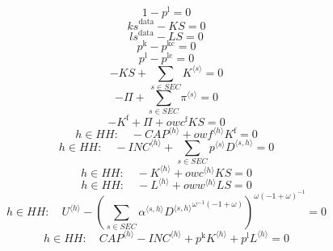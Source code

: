\begin{equation}
1 - p^{\mathrm{l}} = 0
\end{equation}
\begin{equation}
{k\!s}^{\mathrm{data}} - {K\!S} = 0
\end{equation}
\begin{equation}
{l\!s}^{\mathrm{data}} - {L\!S} = 0
\end{equation}
\begin{equation}
p^{\mathrm{k}} - p^{\mathrm{kc}} = 0
\end{equation}
\begin{equation}
p^{\mathrm{l}} - p^{\mathrm{lc}} = 0
\end{equation}
\begin{equation}
-{K\!S} + \sum_{s\in {S\!E\!C}} {K}^{\langle s\rangle} = 0
\end{equation}
\begin{equation}
-\Pi + \sum_{s\in {S\!E\!C}} {\pi}^{\langle s\rangle} = 0
\end{equation}
\begin{equation}
-K^{\mathrm{f}} + \Pi + {{o\!w\!c}^{\mathrm{f}}} {{K\!S}} = 0
\end{equation}
\begin{equation}
h\in {H\!H}\colon\quad -{{C\!A\!P}}^{\langle h\rangle} + {{{o\!w\!f}}^{\langle h\rangle}} {K^{\mathrm{f}}} = 0
\end{equation}
\begin{equation}
h\in {H\!H}\colon\quad -{{I\!N\!C}}^{\langle h\rangle} + \sum_{s\in {S\!E\!C}} {{p}^{\langle s\rangle}} {{D}^{\langle s,h\rangle}} = 0
\end{equation}
\begin{equation}
h\in {H\!H}\colon\quad -{K}^{\langle h\rangle} + {{{o\!w\!c}}^{\langle h\rangle}} {{K\!S}} = 0
\end{equation}
\begin{equation}
h\in {H\!H}\colon\quad -{L}^{\langle h\rangle} + {{{o\!w\!w}}^{\langle h\rangle}} {{L\!S}} = 0
\end{equation}
\begin{equation}
h\in {H\!H}\colon\quad {U}^{\langle h\rangle} - \left(\sum_{s\in {S\!E\!C}} {{\alpha}^{\langle s,h\rangle}} {{{D}^{\langle s,h\rangle}}^{{\omega}^{-1} \left(-1 + \omega\right)}}\right)^{{\omega} \left(-1 + \omega\right)^{-1}} = 0
\end{equation}
\begin{equation}
h\in {H\!H}\colon\quad {{C\!A\!P}}^{\langle h\rangle} - {{I\!N\!C}}^{\langle h\rangle} + {p^{\mathrm{k}}} {{K}^{\langle h\rangle}} + {p^{\mathrm{l}}} {{L}^{\langle h\rangle}} = 0
\end{equation}
